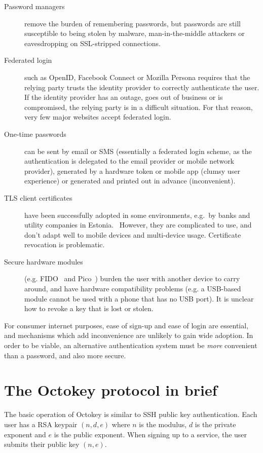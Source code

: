 \documentclass{article}
\begin{document}
\begin{description}
\item[Password managers] remove the burden of remembering passwords, but passwords are still
susceptible to being stolen by malware, man-in-the-middle attackers or eavesdropping on SSL-stripped
connections.
\item[Federated login] such as OpenID, Facebook Connect or Mozilla Persona requires that the relying
party trusts the identity provider to correctly authenticate the user. If the identity provider has
an outage, goes out of business or is compromised, the relying party is in a difficult situation.
For that reason, very few major websites accept federated login.
\item[One-time passwords] can be sent by email or SMS (essentially a federated login scheme, as the
authentication is delegated to the email provider or mobile network provider), generated by a
hardware token or mobile app (clumsy user experience) or generated and printed out in advance
(inconvenient).
\item[TLS client certificates] have been successfully adopted in some environments, e.g.\ by banks
and utility companies in Estonia.~\cite{Parsovs14} However, they are complicated to use, and don't
adapt well to mobile devices and multi-device usage. Certificate revocation is problematic.
\item[Secure hardware modules] (e.g. FIDO~\cite{FIDOOverview} and Pico~\cite{Stajano11}) burden the
user with another device to carry around, and have hardware compatibility problems (e.g. a USB-based
module cannot be used with a phone that has no USB port). It is unclear how to revoke a key that is
lost or stolen.
\end{description}

For consumer internet purposes, ease of sign-up and ease of login are essential, and mechanisms
which add inconvenience are unlikely to gain wide adoption. In order to be viable, an alternative
authentication system must be \emph{more} convenient than a password, and also more secure.

\section{The Octokey protocol in brief}

The basic operation of Octokey is similar to SSH public key authentication. Each user has a RSA
keypair $(n, d, e)$ where $n$ is the modulus, $d$ is the private exponent and $e$ is the public
exponent. When signing up to a service, the user submits their public key $(n, e)$.
\end{document}
